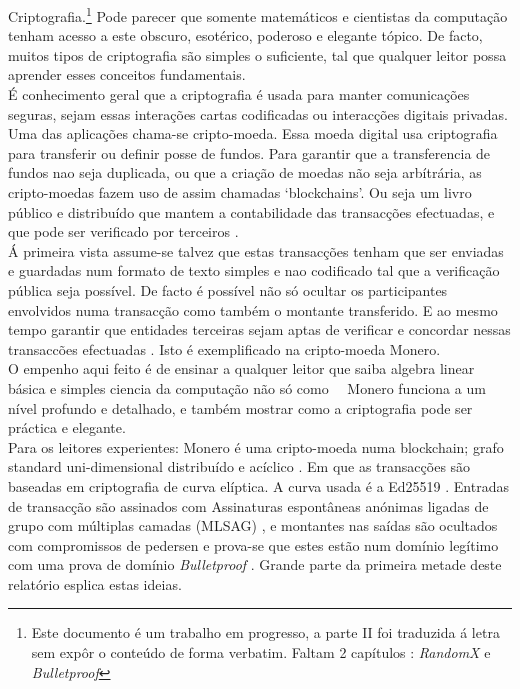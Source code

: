 Criptografia.\footnote{Este documento é um trabalho em progresso, a parte II foi traduzida á letra sem expôr o conteúdo de forma verbatim. Faltam 2 capítulos : {\em RandomX} e {\em Bulletproof}} Pode parecer que somente matemáticos e cientistas da computação tenham acesso a este obscuro, esotérico, poderoso e elegante tópico. De facto, muitos tipos de criptografia são simples o suficiente, tal que qualquer leitor possa aprender esses conceitos fundamentais.
\\ \newline
É conhecimento geral que a criptografia é usada para manter comunicações seguras, sejam essas interações cartas codificadas ou interacções digitais privadas. Uma das aplicações chama-se cripto-moeda. Essa moeda digital usa criptografia para transferir ou definir posse de fundos. Para garantir que a transferencia de fundos nao seja duplicada, ou que a criação de moedas não seja arbítrária, as cripto-moedas fazem uso de assim chamadas `blockchains'. Ou seja um livro público e distribuído que mantem a contabilidade das transacções efectuadas, e que pode ser verificado por terceiros \cite{Nakamoto_bitcoin}.
\\ \newline
Á primeira vista assume-se talvez que estas transacções tenham que ser enviadas e guardadas num formato de texto simples e nao codificado tal que a verificação pública seja possível. De facto é possível não só ocultar os participantes envolvidos numa transacção como também o montante transferido. E ao mesmo tempo garantir que entidades terceiras sejam aptas de verificar e concordar nessas transaccões efectuadas \cite{cryptoNoteWhitePaper}. Isto é exemplificado na cripto-moeda Monero.
\\ \newline
O empenho aqui feito é de ensinar a qualquer leitor que saiba algebra linear básica e simples ciencia da computação não só como   Monero funciona a um nível profundo e detalhado, e também mostrar como a criptografia pode ser práctica e elegante.
\\ \newline
Para os leitores experientes: Monero é uma cripto-moeda numa blockchain; grafo standard uni-dimensional distribuído e acíclico \cite{Nakamoto_bitcoin}. Em que as transacções são baseadas em criptografia de curva elíptica. A curva usada é a Ed25519 \cite{Bernstein2008}. Entradas de transacção são assinados com Assinaturas espontâneas anónimas ligadas de grupo com múltiplas camadas (MLSAG) \cite{MRL-0005-ringct}, e montantes nas saídas são ocultados com compromissos de pedersen \cite{maxwell-ct} e prova-se que estes estão num domínio legítimo com uma prova de domínio {\em Bulletproof} \cite{Bulletproofs_paper}. Grande parte da primeira metade deste relatório esplica estas ideias.    
